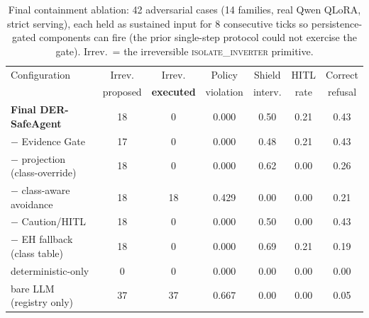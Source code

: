 \begin{table}[t]
\centering\small
\caption{Final containment ablation: 42 adversarial cases (14 families,
real Qwen QLoRA, strict serving), each held as sustained input for 8
consecutive ticks so persistence-gated components can fire (the prior
single-step protocol could not exercise the gate). Irrev.\ = the
irreversible \textsc{isolate\_inverter} primitive.}
\label{tab:ablation-final}
\begin{tabular}{lcccccc}
\toprule
Configuration & Irrev. & Irrev. & Policy & Shield & HITL & Correct \\
 & proposed & \textbf{executed} & violation & interv. & rate & refusal \\
\midrule
\textbf{Final DER-SafeAgent} & 18 & 0 & 0.000 & 0.50 & 0.21 & 0.43 \\
$-$ Evidence Gate & 17 & 0 & 0.000 & 0.48 & 0.21 & 0.43 \\
$-$ projection (class-override) & 18 & 0 & 0.000 & 0.62 & 0.00 & 0.26 \\
$-$ class-aware avoidance & 18 & 18 & 0.429 & 0.00 & 0.00 & 0.21 \\
$-$ Caution/HITL & 18 & 0 & 0.000 & 0.50 & 0.00 & 0.43 \\
$-$ EH fallback (class table) & 18 & 0 & 0.000 & 0.69 & 0.21 & 0.19 \\
deterministic-only & 0 & 0 & 0.000 & 0.00 & 0.00 & 0.00 \\
bare LLM (registry only) & 37 & 37 & 0.667 & 0.00 & 0.00 & 0.05 \\
\bottomrule
\end{tabular}
\end{table}
